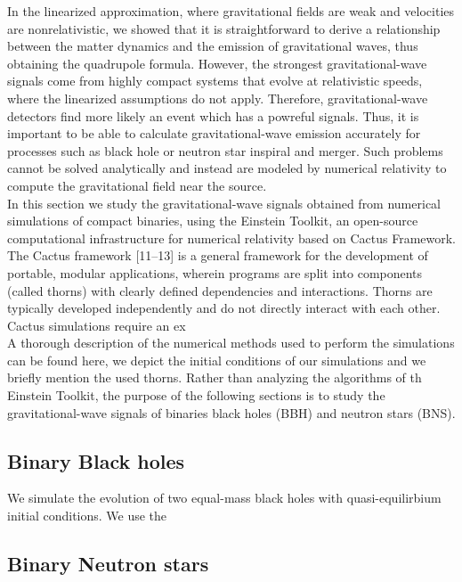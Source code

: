 
In the linearized approximation, where gravitational fields are weak and velocities are nonrelativistic, we showed that it is straightforward to derive a relationship between the matter dynamics and the emission of gravitational waves, thus obtaining the quadrupole formula.
However, the strongest gravitational-wave signals come from highly compact systems that evolve at relativistic speeds, where the linearized assumptions do not apply. 
Therefore, gravitational-wave detectors find more likely an event which has a powreful signals.
Thus, it is important to be able to calculate gravitational-wave emission accurately for processes such as black hole or neutron star inspiral and merger.
Such problems cannot be solved analytically and instead are modeled by numerical relativity to compute the gravitational field near the source.\\
In this section we study the gravitational-wave signals obtained from numerical simulations of compact binaries, using the Einstein Toolkit, an open-source computational infrastructure for numerical relativity based on Cactus Framework.\\
The Cactus framework [11–13] is a general framework for the development of portable, modular applications, wherein programs are split into components (called thorns) with clearly defined dependencies and interactions. 
Thorns are typically developed independently and do not directly interact with each other. 
Cactus simulations require an ex
\\
A thorough description of the numerical methods used to perform the simulations can be found here, we depict the initial conditions of our simulations and we briefly mention the used thorns.
Rather than analyzing the algorithms of th Einstein Toolkit, the purpose of the following sections is to study the gravitational-wave signals of binaries black holes (BBH) and neutron stars (BNS). 

\subsection{Binary Black holes}
We simulate the evolution of two equal-mass black holes with quasi-equilirbium initial conditions.
We use the 




\subsection{Binary Neutron stars}